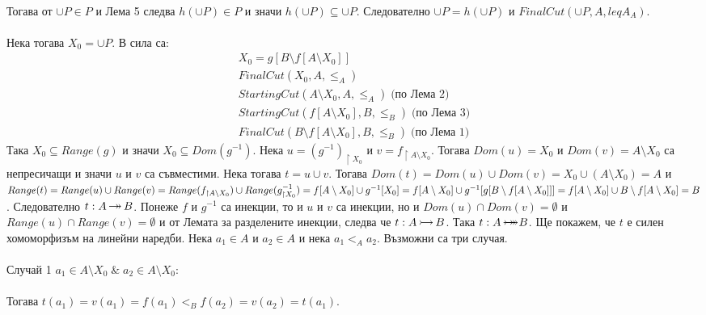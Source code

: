 \documentclass[12pt]{article}
\newcommand{\injection}[0]{\,\mathlarger{\mathlarger{\rightarrowtail}}\,}
\newcommand{\surjection}[0]{\,\mathlarger{\mathlarger{\twoheadrightarrow}}\,}
\newcommand{\bijection}[0]{\mathbin{\mathlarger{\mathlarger{\rightarrowtail}} \hspace{-14pt} \mathlarger{\mathlarger{\twoheadrightarrow}}}}
\begin{document}
\\
Тогава от \(\cup P \in P\) и Лема 5 следва \(h(\cup P) \in P\) и значи \(h(\cup P) \subseteq \cup P\).
Следователно \(\cup P = h(\cup P)\) и \(FinalCut(\cup P, A,leqA_A)\).
\\
\vspace{1mm}
\\
Нека тогава \(X_0 = \cup P\).
В сила са:
\begin{align*}
    X_0 = g[B \setminus f[A \setminus X_0]] \\
    FinalCut(X_0, A, \leq_A) \\
    StartingCut(A \setminus X_0, A, \leq_A) \; \text{(по Лема 2)} \\
    StartingCut(f[A \setminus X_0], B, \leq_B) \; \text{(по Лема 3)} \\
    FinalCut(B \setminus f[A \setminus X_0], B, \leq_B) \; \text{(по Лема 1)}
\end{align*}
Така \(X_0 \subseteq Range(g)\) и значи \(X_0 \subseteq Dom(g^{-1})\).
Нека \(u = (g^{-1})_{\restriction X_0}\) и \(v = f_{\restriction A \setminus X_0}\).
Тогава \(Dom(u) = X_0\) и \(Dom(v) = A \setminus X_0\) са непресичащи 
и значи \(u\) и \(v\) са съвместими. Нека тогава \(t = u \cup v\).
Тогава \(Dom(t) = Dom(u) \cup Dom(v) = X_0 \cup (A \setminus X_0) = A\)
и \(Range(t) = Range(u) \cup Range(v)
= Range(f_{\restriction A \setminus X_0}) \cup Range(g^{-1}_{\restriction X_0})
= f[A \setminus X_0] \cup g^{-1}[X_0]
\\
= f[A \setminus X_0] \cup g^{-1}[g[B \setminus f[A \setminus X_0]]]
= f[A \setminus X_0] \cup B \setminus f[A \setminus X_0] = B\).
Следователно \(t : A \surjection B\).
Понеже \(f\) и \(g^{-1}\) са инекции, то и \(u\) и \(v\) са инекции,
но и \(Dom(u) \cap Dom(v) = \emptyset\) и \(Range(u) \cap Range(v) = \emptyset\)
и от Лемата за разделените инекции, следва че \(t : A \injection B\).
Така \(t : A \bijection B\). Ще покажем, че \(t\) е силен хомоморфизъм на линейни наредби.
Нека \(a_1 \in A\) и \(a_2 \in A\) и нека \(a_1 <_A a_2\).
Възможни са три случая.
\\
\vspace{1mm}
\\
Случай 1 \(a_1 \in A \setminus X_0 \; \& \; a_2 \in A \setminus X_0\):
\\
\vspace{1mm}
\\
Тогава \(t(a_1) = v(a_1) = f(a_1) <_B f(a_2) = v(a_2) = t(a_1)\).
\\
\vspace{1mm}
\end{document}
